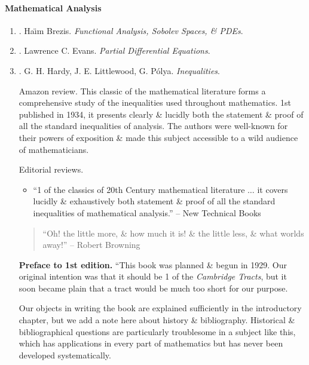 \documentclass{article}
\begin{document}
\paragraph{Mathematical Analysis}

\begin{enumerate}
	\item \cite{Brezis2011}. Ha\"\i m Brezis. {\it Functional Analysis, Sobolev Spaces, \& PDEs}.\hfill{\sf[reading]}
	
	\item \cite{Evans2010}. Lawrence C. Evans. {\it Partial Differential Equations}.\hfill{\sf[reading]}
	
	\item \cite{Hardy_Littlewood_Polya1952}. {\sc G. H. Hardy, J. E. Littlewood, G. P\'{o}lya}. {\it Inequalities}. {}
	
	{\sf Amazon review.} This classic of the mathematical literature forms a comprehensive study of the inequalities used throughout mathematics. 1st published in 1934, it presents clearly \& lucidly both the statement \& proof of all the standard inequalities of analysis. The authors were well-known for their powers of exposition \& made this subject accessible to a wild audience of mathematicians.
	
	{\sf Editorial reviews.}
	\begin{itemize}
		\item ``1 of the classics of 20th Century mathematical literature $\ldots$ it covers lucidly \& exhaustively both statement \& proof of all the standard inequalities of mathematical analysis.'' -- New Technical Books
	\end{itemize}
	\begin{quote}
		``Oh! the little more, \& how much it is! \& the little less, \& what worlds away!'' -- {\sc Robert Browning}
	\end{quote}
	{\bf Preface to 1st edition.} ``This book was planned \& begun in 1929. Our original intention was that it should be 1 of the {\it Cambridge Tracts}, but it soon became plain that a tract would be much too short for our purpose.
	
	Our objects in writing the book are explained sufficiently in the introductory chapter, but we add a note here about history \& bibliography. Historical \& bibliographical questions are particularly troublesome in a subject like this, which has applications in every part of mathematics but has never been developed systematically.
	

\end{enumerate}
\end{document}
